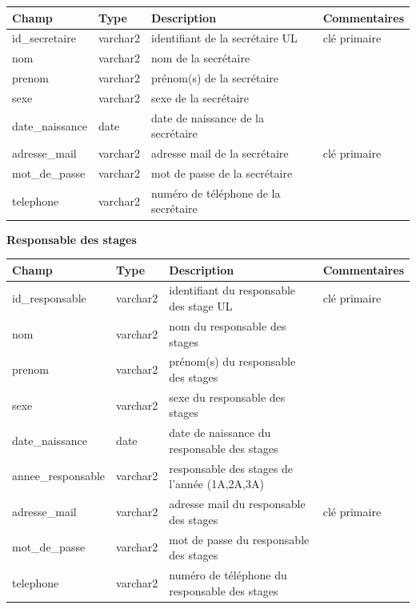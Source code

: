 \documentclass{scrreprt}
\begin{document}
\begin{center}
\begin{tabular}{|p{}|p{2cm}|p{7cm}|p{}|}
  \hline
  \textbf {Champ} & \textbf {Type} & \textbf {Description} & \textbf {Commentaires} \\
  \hline
  id_secretaire & varchar2 & identifiant de la secrétaire UL & clé primaire\\
  \hline
  nom & varchar2 & nom de la secrétaire & \\
  \hline
  prenom & varchar2 & prénom(s) de la secrétaire &  \\
  \hline
  sexe & varchar2 & sexe de la secrétaire &  \\
  \hline
  date_naissance & date & date de naissance de la secrétaire &  \\
  \hline
  adresse_mail & varchar2 & adresse mail de la secrétaire & clé primaire  \\
  \hline
  mot_de_passe & varchar2 & mot de passe de la secrétaire &  \\
  \hline
  telephone & varchar2 & numéro de téléphone de la secrétaire &  \\
  \hline
\end{tabular}

\vspace {1cm}
\textbf 
{Responsable des stages}
\vspace {0,5cm}

\begin{tabular}{|p{}|p{2cm}|p{7cm}|p{}|}
  \hline
  \textbf {Champ} & \textbf {Type} & \textbf {Description} & \textbf {Commentaires} \\
  \hline
  id_responsable & varchar2 & identifiant du responsable des stage UL & clé primaire\\
  \hline
  nom & varchar2 & nom du responsable des stages & \\
  \hline
  prenom & varchar2 & prénom(s) du responsable des stages &  \\
  \hline
  sexe & varchar2 & sexe du responsable des stages &  \\
  \hline
  date_naissance & date & date de naissance du responsable des stages &  \\
  \hline
  annee_responsable & varchar2 & responsable des stages de l'année (1A,2A,3A) &  \\
  \hline
  adresse_mail & varchar2 & adresse mail du responsable des stages & clé primaire  \\
  \hline
  mot_de_passe & varchar2 & mot de passe du responsable des stages &  \\
  \hline
  telephone & varchar2 & numéro de téléphone du responsable des stages &  \\
  \hline
\end{tabular}


\end{center}
\end{document}
